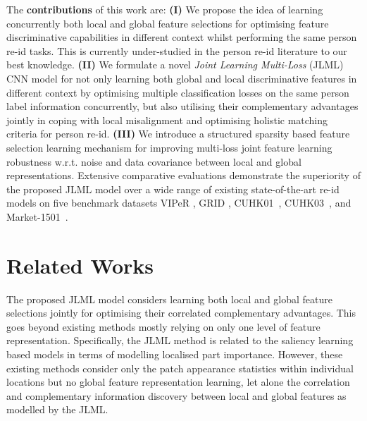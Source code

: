 \documentclass{article}
\begin{document}
The {\bf contributions} of this work are:
{\bf (I)} We propose the idea of learning concurrently both local and global
feature selections for optimising feature discriminative capabilities
in different context whilst performing the same person re-id tasks. This is
currently under-studied in the person re-id literature to our best knowledge. 
{\bf (II)} 
We formulate a novel {\em Joint Learning Multi-Loss} (JLML) CNN model
for not only learning both global and local discriminative features in
different context by optimising multiple classification losses
on the same person label information concurrently, but also utilising their
complementary advantages jointly in coping with local misalignment and optimising
holistic matching criteria for person re-id.
{\bf (III)} 
We introduce a structured sparsity based feature selection learning mechanism
for improving multi-loss joint feature learning robustness w.r.t. noise and data
covariance between local and global representations.
Extensive comparative evaluations demonstrate the superiority of the
proposed JLML model over a wide range of existing state-of-the-art
re-id models on five benchmark datasets VIPeR \cite{ELF_ECCV08}, GRID \cite{loy2009multi},
CUHK01~\cite{li2012human}, CUHK03~\cite{li2014deepreid}, and Market-1501~\cite{zheng2015scalable}.




\section{Related Works}
The proposed JLML model considers
learning both local and global feature selections jointly for optimising
their correlated complementary advantages. This goes beyond existing methods
mostly relying on only one level of feature representation. 
Specifically, the JLML method is related to the saliency learning
based models \cite{SalienceReId_CVPR13,WangEtAl_BMVC14} in terms of 
modelling localised part importance.
However, these existing methods consider only the patch appearance statistics within individual
locations but no global feature representation learning, 
let alone the correlation and complementary information discovery
between local and global features as modelled by the JLML.
\end{document}
